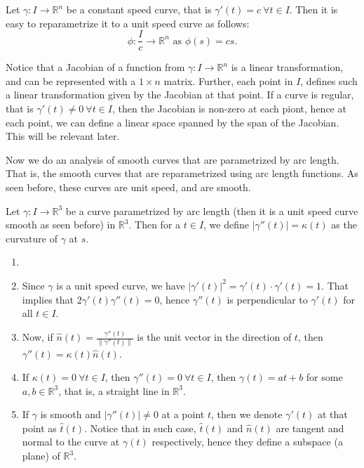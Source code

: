 \begin{eg}
    Let $\gamma:I\to\mathbb{R}^{n}$ be a constant speed curve, that is $\gamma'(t)=c~\forall t\in I$. Then it is easy to reparametrize it to a unit speed curve as follows: $$\phi:\frac{I}{c}\to\mathbb{R}^{n}\text{ as }\phi(s)=cs.$$
\end{eg}
\vspace{0.4cm}
\begin{note}
    Notice that a Jacobian of a function from $\gamma:I\to \mathbb{R}^{n}$ is a linear transformation, and can be represented with a $1\times n$ matrix. Further, each point in $I$, defines such a linear transformation given by the Jacobian at that point. If a curve is regular, that is $\gamma'(t)\neq0~\forall t\in I$, then the Jacobian is non-zero at each piont, hence at each point, we can define a linear space spanned by the span of the Jacobian. This will be relevant later.
\end{note}
\vspace{0.4cm}
\begin{motive}
    Now we do an analysis of smooth curves that are parametrized by arc length. That is, the smooth curves that are reparametrized using arc length functions. As seen before, these curves are unit speed, and are smooth.
\end{motive}
\vspace{0.4cm}
\begin{definition}
    Let $\gamma:I\to \mathbb{R}^{3}$ be a curve parametrized by arc length (then it is a unit speed curve smooth as seen before) in $\mathbb{R}^{3}$. Then for a $t\in I$, we define $|\gamma''(t)|=\kappa(t)$ as the curvature of $\gamma$ at $s$.
\end{definition}
\vspace{0.4cm}
\begin{property}
    \begin{enumerate}[label=\roman*.]
        \item []
        \item Since $\gamma$ is a unit speed curve, we have $|\gamma'(t)|^{2}=\gamma'(t)\cdot\gamma'(t)=1$. That implies that $2\gamma'(t)\gamma''(t)=0$, hence $\gamma''(t)$ is perpendicular to $\gamma'(t)$ for all $t\in I$. 
        \item Now, if $\hat{n}(t)=\frac{\gamma''(t)}{\|\gamma''(t)\|}$ is the unit vector in the direction of $t$, then $\gamma''(t)=\kappa(t)\hat{n}(t)$.
        \item If $\kappa(t)=0~\forall t\in I$, then $\gamma''(t)=0~\forall t\in I$, then $\gamma(t)=at+b$ for some $a,b\in \mathbb{R}^{3}$, that is, a straight line in $\mathbb{R}^{3}$.
        \item If $\gamma$ is smooth and $|\gamma''(t)|\neq 0$ at a point $t$, then we denote $\gamma'(t)$ at that point as $\hat{t}(t)$. Notice that in such case, $\hat{t}(t)$ and $\hat{n}(t)$ are tangent and normal to the curve at $\gamma(t)$ respectively, hence they define a subspace (a plane) of $\mathbb{R}^{3}$.
    \end{enumerate}
\end{property}
